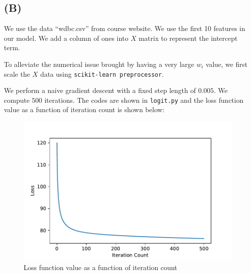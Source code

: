 \documentclass[a4paper,11pt]{article}
\begin{document}
\subsection{(B)}

We use the data “wdbc.csv” from course website. We use the first 10 features in our model. We add a column of ones into $X$ matrix to represent the intercept term.

To alleviate the numerical issue brought by having a very large $w_i$ value, we first scale the $X$ data using \texttt{scikit-learn preprocessor}. 

We perform a naive gradient descent with a fixed step length of $0.005$. We compute $500$ iterations. The codes are shown in \texttt{logit.py} and the loss function value as a function of iteration count is shown below:

\begin{figure}[!h]
\caption{Loss function value as a function of iteration count}
\centering
\includegraphics[width = \textwidth]{fig_logit}
\end{figure}




%
%
\end{document}
